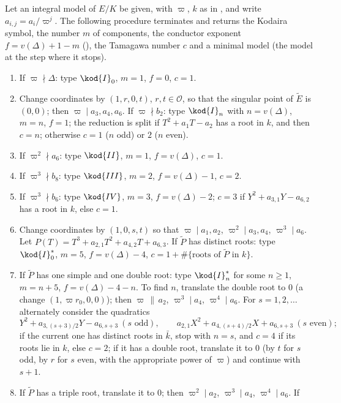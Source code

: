 \begin{theorem}\label{thm:reduction:tate-algorithm}
Let an integral model of $E/K$ be given, with $\varpi$, $k$ as in , and write
$a_{i,j}=a_i/\varpi^j$. The following procedure terminates and returns the Kodaira symbol, the number $m$ of
components, the conductor exponent $f=v(\Delta)+1-m$ (), the Tamagawa number $c$ and a
minimal model (the model at the step where it stops).
\begin{enumerate}[label=\textbf{Step \arabic*.},leftmargin=*]
\item If $\varpi\nmid\Delta$: type $\kod{I}_0$, $m=1$, $f=0$, $c=1$.
\item Change coordinates by $(1,r,0,t)$, $r,t\in\mathcal O$, so that the singular point of $\tilde E$ is $(0,0)$; then
$\varpi\mid a_3,a_4,a_6$. If $\varpi\nmid b_2$: type $\kod{I}_n$ with $n=v(\Delta)$, $m=n$, $f=1$; the reduction is split
if $T^2+a_1T-a_2$ has a root in $k$, and then $c=n$; otherwise $c=1$ ($n$ odd) or $2$ ($n$ even).
\item If $\varpi^2\nmid a_6$: type $\kod{II}$, $m=1$, $f=v(\Delta)$, $c=1$.
\item If $\varpi^3\nmid b_8$: type $\kod{III}$, $m=2$, $f=v(\Delta)-1$, $c=2$.
\item If $\varpi^3\nmid b_6$: type $\kod{IV}$, $m=3$, $f=v(\Delta)-2$; $c=3$ if $Y^2+a_{3,1}Y-a_{6,2}$ has a root in $k$,
else $c=1$.
\item Change coordinates by $(1,0,s,t)$ so that $\varpi\mid a_1,a_2$, $\varpi^2\mid a_3,a_4$, $\varpi^3\mid a_6$. Let
$P(T)=T^3+a_{2,1}T^2+a_{4,2}T+a_{6,3}$. If $\tilde P$ has distinct roots: type $\kod{I}_0^*$, $m=5$,
$f=v(\Delta)-4$, $c=1+\#\{\text{roots of }\tilde P\text{ in }k\}$.
\item If $\tilde P$ has one simple and one double root: type $\kod{I}_n^*$ for some $n\ge1$, $m=n+5$,
$f=v(\Delta)-4-n$. To find $n$, translate the double root to $0$ (a change $(1,\varpi r_0,0,0)$); then
$\varpi\,\|\,a_2$, $\varpi^3\mid a_4$, $\varpi^4\mid a_6$. For $s=1,2,\dots$ alternately consider the quadratics
\[
Y^2+a_{3,(s+3)/2}Y-a_{6,s+3}\ (s\text{ odd}),\qquad a_{2,1}X^2+a_{4,(s+4)/2}X+a_{6,s+3}\ (s\text{ even});
\]
if the current one has distinct roots in $\bar k$, stop with $n=s$, and $c=4$ if its roots lie in $k$, else $c=2$;
if it has a double root, translate it to $0$ (by $t$ for $s$ odd, by $r$ for $s$ even, with the appropriate power
of $\varpi$) and continue with $s+1$.
\item If $\tilde P$ has a triple root, translate it to $0$; then $\varpi^2\mid a_2$, $\varpi^3\mid a_4$, $\varpi^4\mid a_6$. If

\end{enumerate}
\end{theorem}
